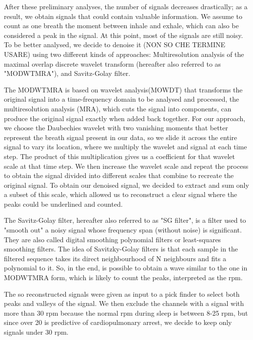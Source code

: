 \documentclass[a4paper,11pt, oneside,italian]{article}
\begin{document}
 After these preliminary analyses, the number of signals decreases drastically; as a result, we obtain signals that could contain valuable information.
We assume to count as one breath the moment between inhale and exhale, which can also be considered a peak in the signal.
At this point, most of the signals are still noisy. To be better analysed, we decide to denoise it (NON SO CHE TERMINE USARE) using 
two different kinds of approaches: Multiresolution analysis of the maximal overlap discrete wavelet transform (hereafter also referred to as "MODWTMRA"), and Savitz-Golay filter.

The MODWTMRA is based on wavelet analysis(MOWDT) that transforms the original signal into a time-frequency domain 
to be analysed and processed, the multiresolution analysis (MRA), which cuts the signal into components, can produce the original signal exactly when added back together.
For our approach, we choose the Daubechies wavelet with two vanishing moments that better represent the breath signal present in our data, so we slide it across the entire signal to vary its location, where we multiply the wavelet and signal at each time step. 
The product of this multiplication gives us a coefficient for that wavelet scale at that time step. 
We then increase the wavelet scale and repeat the process to obtain the signal divided into different scales that combine to recreate the original signal. 
To obtain our denoised signal, we decided to extract and sum only a subset of this scale, which allowed us to reconstruct a clear signal where the peaks could be underlined and counted.

The Savitz-Golay filter, hereafter also referred to as "SG filter", is a filter used to "smooth out" a noisy signal whose frequency span (without noise) is significant. 
They are also called digital smoothing polynomial filters or least-squares smoothing filters. 
The idea of Savitzky-Golay filters is that each sample in the filtered sequence takes its direct neighbourhood of N neighbours and fits a polynomial to it.
So, in the end, is possible to obtain a wave similar to the one in MODWTMRA form, which is likely to count the peaks, interpreted as the rpm.

The so reconstructed signals were given as input to a pick finder to select both peaks and valleys of the signal. 
We then exclude the channels with a signal with more than 30 rpm because the normal rpm during sleep is between 8-25 rpm, but since over 20 is predictive of cardiopulmonary arrest, we decide to keep only signals under 30 rpm.
\end{document}
